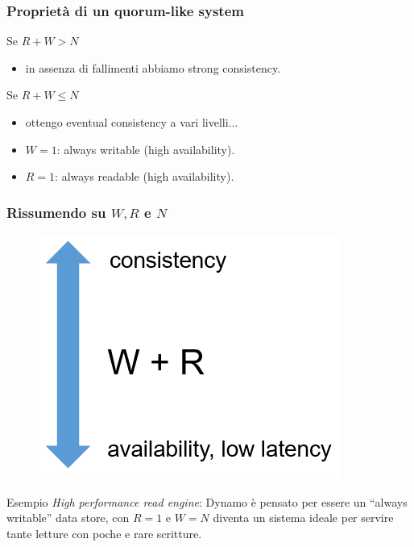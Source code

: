 \begin{frame}
  \frametitle{Proprietà di un quorum-like system}
  \begin{block}{Se $R + W > N$}
    \begin{itemize}
      \item in assenza di fallimenti abbiamo \alert{strong consistency}.
    \end{itemize}
  \end{block}
  \begin{block}{Se $R + W \leq N$}
    \begin{itemize}
    \item ottengo \alert{eventual consistency} a vari livelli...
    \item $W = 1$: always writable (high availability).
    \item $R = 1$: always readable (high availability).
    \end{itemize}
  \end{block}
\end{frame}


\begin{frame}
  \frametitle{Rissumendo su $W, R$ e $N$}
  \begin{figure}
  \flushleft
  \includegraphics[scale=0.4]{dynamo/consistency-trade-off.png}
  \end{figure}
  \begin{block}{Esempio}
  \emph{High performance read engine}: Dynamo è pensato per essere un ``always writable'' data store, con $R=1$ e $W=N$ diventa un sistema ideale per servire tante letture con poche e rare scritture. 
  \end{block}
\end{frame}


